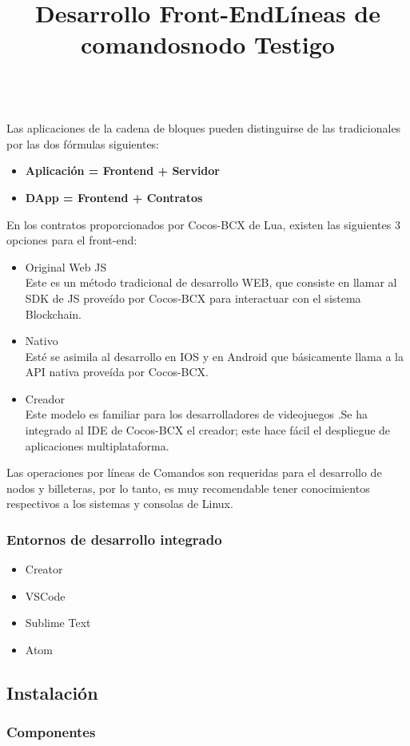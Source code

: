 \documentclass{article}
\begin{document}
\title{Desarrollo Front-End}\\
Las aplicaciones de la cadena de bloques pueden distinguirse de las tradicionales por las dos fórmulas siguientes:
\begin{itemize}
    \item\textbf{Aplicación = Frontend + Servidor} 
    \item\textbf{DApp = Frontend + Contratos} 
\end{itemize}
En los contratos proporcionados por Cocos-BCX de Lua, existen las siguientes 3 opciones para el front-end:
\begin{itemize}
    \item  Original Web JS\\
    Este es un método tradicional de desarrollo WEB, que consiste en llamar al SDK de JS proveído por Cocos-BCX para interactuar con el sistema Blockchain.
     \item  Nativo\\
    Esté se asimila al desarrollo en IOS y en Android que básicamente llama a la API nativa proveída por Cocos-BCX.
    \item  Creador\\
    Este modelo es familiar para los desarrolladores de videojuegos .Se ha integrado al IDE de Cocos-BCX el creador; este hace fácil el despliegue de aplicaciones multiplataforma.
\end{itemize}

\title{Líneas de comandos}
Las operaciones por líneas de Comandos son requeridas para el desarrollo de nodos y billeteras, por lo tanto, es muy recomendable tener conocimientos respectivos a los sistemas y consolas de Linux.    

\subsubsection{Entornos de desarrollo integrado}
\begin{itemize}
    \item Creator
    \item VSCode
    \item Sublime Text
    \item Atom 
\end{itemize}

\subsection{Instalación}
\subsubsection{Componentes}
\title{nodo Testigo}
\end{document}
